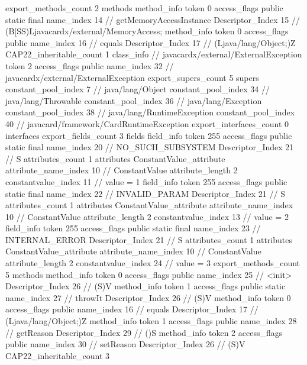 {{{{{{{				}
				}
			}
			}
			export_methods_count	2
			methods {
				method_info {
					token	0
					access_flags	public static final
					name_index	14		// getMemoryAccessInstance
					Descriptor_Index	15		// (B[SS)Ljavacardx/external/MemoryAccess;
				}
				method_info {
					token	0
					access_flags	public
					name_index	16		// equals
					Descriptor_Index	17		// (Ljava/lang/Object;)Z
				}
			}
			CAP22_inheritable_count	1
		}
		class_info {		// javacardx/external/ExternalException
			token	2
			access_flags	public
			name_index	32		// javacardx/external/ExternalException
			export_supers_count	5
			supers {
				constant_pool_index	7		// java/lang/Object
				constant_pool_index	34		// java/lang/Throwable
				constant_pool_index	36		// java/lang/Exception
				constant_pool_index	38		// java/lang/RuntimeException
				constant_pool_index	40		// javacard/framework/CardRuntimeException
			}
			export_interfaces_count	0
			interfaces {
			}
			export_fields_count	3
			fields {
			field_info {
				token	255
				access_flags	public static final
				name_index	20		// NO_SUCH_SUBSYSTEM
				Descriptor_Index	21		// S
				attributes_count	1
				attributes {
				ConstantValue_attribute {
					attribute_name_index	10		// ConstantValue
					attribute_length	2
					constantvalue_index	11		// value = 1
				}
				}
			}
			field_info {
				token	255
				access_flags	public static final
				name_index	22		// INVALID_PARAM
				Descriptor_Index	21		// S
				attributes_count	1
				attributes {
				ConstantValue_attribute {
					attribute_name_index	10		// ConstantValue
					attribute_length	2
					constantvalue_index	13		// value = 2
				}
				}
			}
			field_info {
				token	255
				access_flags	public static final
				name_index	23		// INTERNAL_ERROR
				Descriptor_Index	21		// S
				attributes_count	1
				attributes {
				ConstantValue_attribute {
					attribute_name_index	10		// ConstantValue
					attribute_length	2
					constantvalue_index	24		// value = 3
				}
				}
			}
			}
			export_methods_count	5
			methods {
				method_info {
					token	0
					access_flags	public
					name_index	25		// <init>
					Descriptor_Index	26		// (S)V
				}
				method_info {
					token	1
					access_flags	public static
					name_index	27		// throwIt
					Descriptor_Index	26		// (S)V
				}
				method_info {
					token	0
					access_flags	public
					name_index	16		// equals
					Descriptor_Index	17		// (Ljava/lang/Object;)Z
				}
				method_info {
					token	1
					access_flags	public
					name_index	28		// getReason
					Descriptor_Index	29		// ()S
				}
				method_info {
					token	2
					access_flags	public
					name_index	30		// setReason
					Descriptor_Index	26		// (S)V
				}
			}
			CAP22_inheritable_count	3
		}
	}
}
